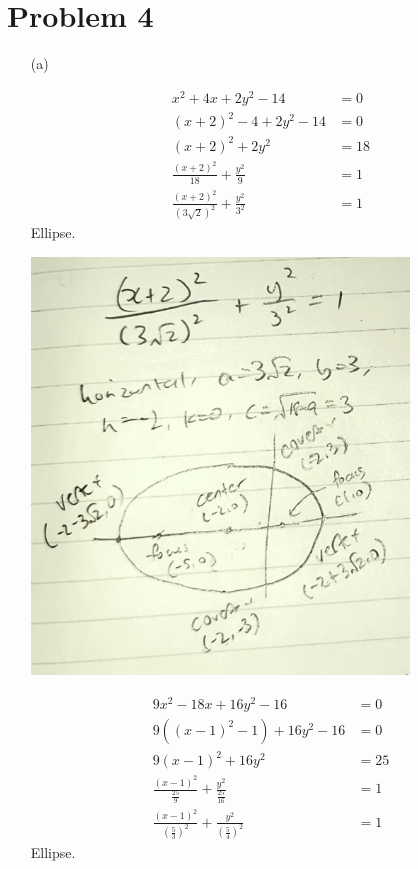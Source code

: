 \documentclass{article}
\begin{document}
\section*{Problem 4}
\begin{itemize}
\item[(a)]
	\begin{minipage}[t]{0.49\linewidth}
		\begin{align*}
			x^2+4x+2y^2-14&=0 \\
			(x+2)^2-4+2y^2-14&=0 \\
			(x+2)^2+2y^2&=18 \\
			\frac{(x+2)^2}{18}+\frac{y^2}{9}&=1 \\
			\frac{(x+2)^2}{\left(3\sqrt{2}\right)^2}+\frac{y^2}{3^2}&=1
		\end{align*}
		Ellipse.

		\includegraphics*[width=0.9\linewidth]{q4a1.png}
	\end{minipage}
	\begin{minipage}[t]{0.49\linewidth}
		\begin{align*}
			9x^2-18x+16y^2-16&=0 \\
			9\left((x-1)^2-1\right)+16y^2-16&=0 \\
			9(x-1)^2+16y^2&=25 \\
			\frac{(x-1)^2}{\frac{25}{9}}+\frac{y^2}{\frac{25}{16}}&=1 \\
			\frac{(x-1)^2}{\left(\frac{5}{3}\right)^2}+\frac{y^2}{\left(\frac{5}{4}\right)^2}&=1
		\end{align*}
		Ellipse.


\end{minipage}
\end{itemize}
\end{document}

